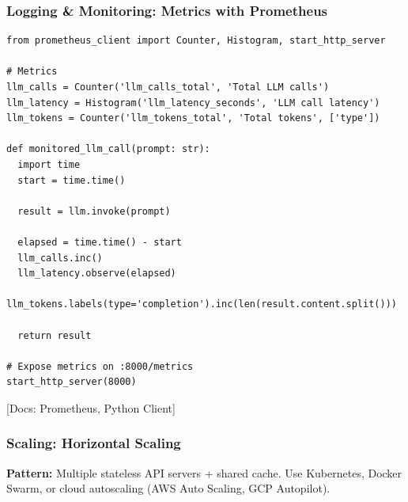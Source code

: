 \documentclass[aspectratio=169,11pt]{beamer}
\newcommand{\docref}[1]{{\scriptsize\color{docgray}[Docs: #1]}}
\begin{document}
\begin{frame}[fragile,shrink=8]
\frametitle{Logging \& Monitoring: Metrics with Prometheus}

\begin{lstlisting}
from prometheus_client import Counter, Histogram, start_http_server

# Metrics
llm_calls = Counter('llm_calls_total', 'Total LLM calls')
llm_latency = Histogram('llm_latency_seconds', 'LLM call latency')
llm_tokens = Counter('llm_tokens_total', 'Total tokens', ['type'])

def monitored_llm_call(prompt: str):
  import time
  start = time.time()

  result = llm.invoke(prompt)

  elapsed = time.time() - start
  llm_calls.inc()
  llm_latency.observe(elapsed)
  llm_tokens.labels(type='completion').inc(len(result.content.split()))

  return result

# Expose metrics on :8000/metrics
start_http_server(8000)
\end{lstlisting}

\docref{Prometheus, Python Client}

\end{frame}

\begin{frame}
\frametitle{Scaling: Horizontal Scaling}


\vspace{0.5em}

\small\textbf{Pattern:} Multiple stateless API servers + shared cache. Use Kubernetes, Docker Swarm, or cloud autoscaling (AWS Auto Scaling, GCP Autopilot).

\end{frame}
\end{document}
